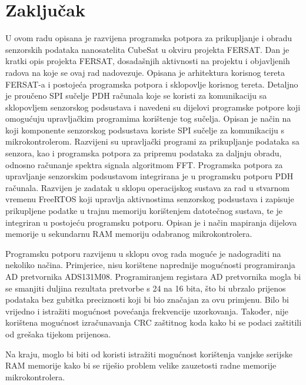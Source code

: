 \chapter{Zaključak}

U ovom radu opisana je razvijena programska potpora za prikupljanje i obradu senzorskih podataka nanosatelita CubeSat u okviru projekta FERSAT. Dan je kratki opis projekta FERSAT, dosadašnjih aktivnosti na projektu i objavljenih radova na koje se ovaj rad nadovezuje. Opisana je arhitektura korisnog tereta FERSAT-a i postojeća programska potpora i sklopovlje korisnog tereta. Detaljno je proučeno SPI sučelje PDH računala koje se koristi za komunikaciju sa sklopovljem senzorskog podsustava i navedeni su dijelovi programske potpore koji omogućuju upravljačkim programima korištenje tog sučelja. Opisan je način na koji komponente senzorskog podsustava koriste SPI sučelje za komunikaciju s mikrokontrolerom. Razvijeni su upravljački programi za prikupljanje podataka sa senzora, kao i programska potpora za pripremu podataka za daljnju obradu, odnosno računanje spektra signala algoritmom FFT. Programska potpora za upravljanje senzorskim podsustavom integrirana je u programsku potporu PDH računala. Razvijen je zadatak u sklopu operacijskog sustava za rad u stvarnom vremenu FreeRTOS koji upravlja aktivnostima senzorskog podsustava i zapisuje prikupljene podatke u trajnu memoriju korištenjem datotečnog sustava, te je integriran u postojeću programsku potporu. Opisan je i način mapiranja dijelova memorije u sekundarnu RAM memoriju odabranog mikrokontrolera.

Programsku potporu razvijenu u sklopu ovog rada moguće je nadograditi na nekoliko načina. Primjerice, nisu korištene naprednije mogućnosti programiranja AD pretvornika ADS131M08. Programiranjem registara AD pretvornika mogla bi se smanjiti duljina rezultata pretvorbe s 24 na 16 bita, što bi ubrzalo prijenos podataka bez gubitka preciznosti koji bi bio značajan za ovu primjenu. Bilo bi vrijedno i istražiti mogućnost povećanja frekvencije uzorkovanja. Također, nije korištena mogućnost izračunavanja CRC zaštitnog koda kako bi se podaci zaštitili od grešaka tijekom prijenosa.

Na kraju, moglo bi biti od koristi istražiti mogućnost korištenja vanjske serijske RAM memorije kako bi se riješio problem velike zauzetosti radne memorije mikrokontrolera.